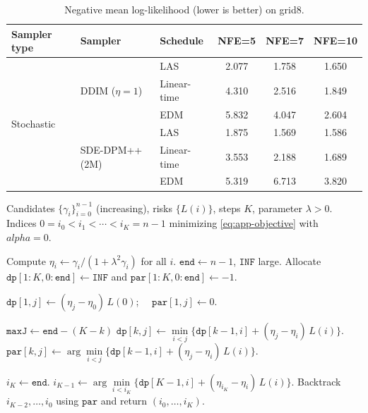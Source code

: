 \documentclass[11pt]{article}
\def\alpha{alpha}%
\theoremstyle{definition}
\numberwithin{equation}{section}
\begin{document}
\begin{table}[t]
\centering
\caption{Negative mean log-likelihood (lower is better) on grid8.}
\label{tab:grid8_nll}
\begin{tabular}{ll|lccc}
\toprule
Sampler type & Sampler & Schedule & NFE=5 & NFE=7 & NFE=10\\
\midrule
\multirow{6}{*}{Stochastic}
 & \multirow{3}{*}{DDIM ($\eta=1$)}
 & LAS  & 2.077 & 1.758 & 1.650\\
 &  & Linear-time & 4.310 & 2.516 & 1.849\\
 &  & EDM & 5.832 & 4.047 & 2.604\\
\cmidrule(lr){2-6}
 & \multirow{3}{*}{SDE-DPM++(2M) }
 & LAS & 1.875 & 1.569 & 1.586\\
 &  & Linear-time & 3.553 & 2.188 & 1.689\\
 &  & EDM & 5.319 & 6.713 & 3.820\\
\bottomrule
\end{tabular}
\end{table}


\begin{algorithm}[tb]
\caption{Exact schedule optimization for $\alpha=0$ (first-order DP)}
\label{alg:dp-alpha0}
\begin{algorithmic}[1]
\REQUIRE Candidates $\{\gamma_i\}_{i=0}^{n-1}$ (increasing), risks $\{L(i)\}$, steps $K$, parameter $\lambda>0$.
\ENSURE Indices $0=i_0<i_1<\cdots<i_K=n-1$ minimizing \eqref{eq:app-objective} with $\alpha=0$.

\STATE Compute $\eta_i \leftarrow \gamma_i/(1+\lambda^2\gamma_i)$ for all $i$.
\STATE $\texttt{end} \leftarrow n-1$, $\texttt{INF}$ large.
\STATE Allocate $\texttt{dp}[1{:}K,0{:}\texttt{end}] \leftarrow \texttt{INF}$ and $\texttt{par}[1{:}K,0{:}\texttt{end}] \leftarrow -1$.


  \STATE $\texttt{dp}[1,j] \leftarrow (\eta_j-\eta_0)\,L(0)$; \ \ $\texttt{par}[1,j]\leftarrow 0$.
\ENDFOR


  \STATE $\texttt{maxJ} \leftarrow \texttt{end}-(K-k)$ 
    \STATE $\texttt{dp}[k,j] \leftarrow \min\limits_{i<j}\Big\{\texttt{dp}[k-1,i] + (\eta_j-\eta_i)\,L(i)\Big\}$.
    \STATE $\texttt{par}[k,j] \leftarrow \arg\min\limits_{i<j}\Big\{\texttt{dp}[k-1,i] + (\eta_j-\eta_i)\,L(i)\Big\}$.
  \ENDFOR
\ENDFOR


\STATE $i_K \leftarrow \texttt{end}$.
\STATE $i_{K-1} \leftarrow \arg\min\limits_{i<i_K}\Big\{\texttt{dp}[K-1,i] + (\eta_{i_K}-\eta_i)\,L(i)\Big\}$.
\STATE Backtrack $i_{K-2},\dots,i_0$ using $\texttt{par}$ and return $(i_0,\dots,i_K)$.
\end{algorithmic}
\end{algorithm}
\end{document}
